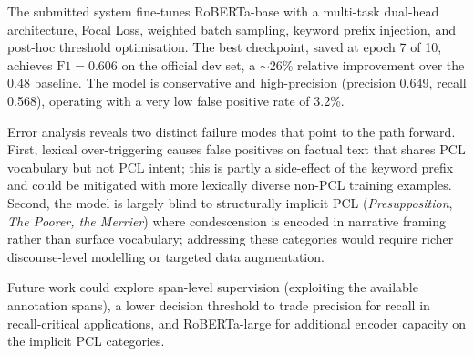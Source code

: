 \documentclass[11pt,a4paper]{article}
\begin{document}
The submitted system fine-tunes RoBERTa-base with a multi-task dual-head architecture, Focal Loss, weighted batch sampling, keyword prefix injection, and post-hoc threshold optimisation. The best checkpoint, saved at epoch 7 of 10, achieves $\text{F1} = 0.606$ on the official dev set, a $\sim$26\% relative improvement over the 0.48 baseline. The model is conservative and high-precision (precision 0.649, recall 0.568), operating with a very low false positive rate of 3.2\%.

Error analysis reveals two distinct failure modes that point to the path forward. First, lexical over-triggering causes false positives on factual text that shares PCL vocabulary but not PCL intent; this is partly a side-effect of the keyword prefix and could be mitigated with more lexically diverse non-PCL training examples. Second, the model is largely blind to structurally implicit PCL (\textit{Presupposition}, \textit{The Poorer, the Merrier}) where condescension is encoded in narrative framing rather than surface vocabulary; addressing these categories would require richer discourse-level modelling or targeted data augmentation.

Future work could explore span-level supervision (exploiting the available annotation spans), a lower decision threshold to trade precision for recall in recall-critical applications, and RoBERTa-large for additional encoder capacity on the implicit PCL categories.

\newpage


\end{document}
